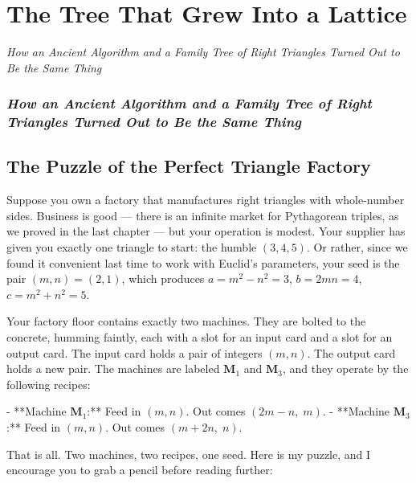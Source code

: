 \chapter{The Tree That Grew Into a Lattice}

\begin{center}\textit{How an Ancient Algorithm and a Family Tree of Right Triangles Turned Out to Be the Same Thing}\end{center}
\bigskip

\subsection*{\textit{How an Ancient Algorithm and a Family Tree of Right Triangles Turned Out to Be the Same Thing}}

\bigskip

\section*{The Puzzle of the Perfect Triangle Factory}

Suppose you own a factory that manufactures right triangles with whole-number sides. Business is good --- there is an infinite market for Pythagorean triples, as we proved in the last chapter --- but your operation is modest. Your supplier has given you exactly one triangle to start: the humble $(3, 4, 5)$. Or rather, since we found it convenient last time to work with Euclid's parameters, your seed is the pair $(m, n) = (2, 1)$, which produces $a = m^2 - n^2 = 3$, $b = 2mn = 4$, $c = m^2 + n^2 = 5$.

Your factory floor contains exactly two machines. They are bolted to the concrete, humming faintly, each with a slot for an input card and a slot for an output card. The input card holds a pair of integers $(m, n)$. The output card holds a new pair. The machines are labeled $\mathbf{M}_1$ and $\mathbf{M}_3$, and they operate by the following recipes:

- **Machine $\mathbf{M}_1$:** Feed in $(m, n)$. Out comes $(2m - n,\; m)$.
- **Machine $\mathbf{M}_3$:** Feed in $(m, n)$. Out comes $(m + 2n,\; n)$.

That is all. Two machines, two recipes, one seed. Here is my puzzle, and I encourage you to grab a pencil before reading further:


